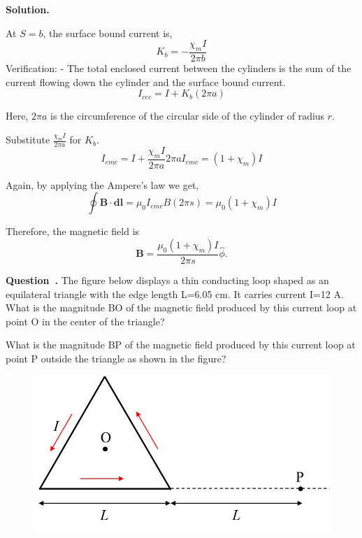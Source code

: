 \documentclass[12pt, a4paper, oneside]{report}
\newcounter{question}
\newenvironment{question}[1][]{\refstepcounter{question}\par\medskip
   \begin{mdframed}[backgroundcolor=gray!20]
   \noindent \textbf{Question~\thequestion. #1} \rmfamily}{\end{mdframed}\medskip}
\newenvironment{solution}{
  \par\medskip\noindent
  \textbf{Solution.}\quad\itshape
  \par\noindent\makebox[\linewidth]{\rule{\textwidth}{0.4pt}}
}{
  \par\noindent\makebox[\linewidth]{\rule{\textwidth}{0.4pt}}
  \par\medskip
}
\begin{document}
\begin{solution}
At $S=b$, the surface bound current is,
$$
K_b=-\frac{\chi_m I}{2 \pi b}
$$
Verification: -
The total enclosed current between the cylinders is the sum of the current flowing down the cylinder and the surface bound current.
$$
I_{c e c}=I+K_b(2 \pi a)
$$

Here, $2 \pi a$ is the circumference of the circular side of the cylinder of radius $r$.

Substitute $\frac{\chi_m I}{2 \pi a}$ for $K_b$.
$$
 I_{e m c}=I+\frac{\chi_m I}{2 \pi a} 2 \pi a  I_{e m c}=\left(1+\chi_m\right) I
$$

Again, by applying the Ampere's law we get,
$$
\oint \mathbf{B} \cdot \mathbf{d} \mathbf{l}  =\mu_0 I_{e m c} B(2 \pi s)  =\mu_0\left(1+\chi_m\right) I
$$

Therefore, the magnetic field is
$$
\mathbf{B}=\frac{\mu_0\left(1+\chi_m\right) I}{2 \pi s} \hat{\phi}.
$$
\end{solution}

\begin{question}
The figure below displays a thin conducting loop shaped as an equilateral triangle with the edge length L=6.05 cm. It carries current I=12 A. What is the magnitude BO of the magnetic field produced by this current loop at point O in the center of the triangle?

What is the magnitude BP of the magnetic field produced by this current loop at point P outside the triangle as shown in the figure?

\end{question}

\begin{figure}[ht!]
    \centering
    \includegraphics[width=0.5\linewidth]{10.png}
    \caption{}
    \label{fig:enter-label}
\end{figure}
\end{document}
